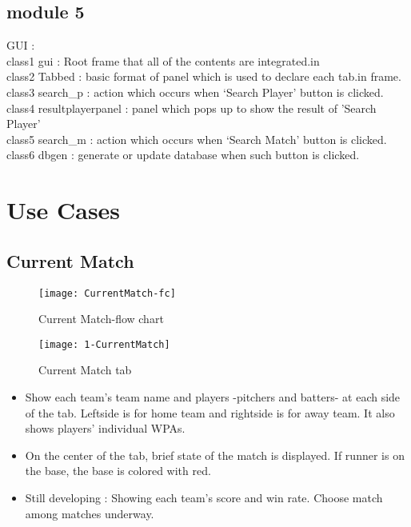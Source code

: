 \documentclass[conference,compsoc, twocolumn]{IEEEtran}
\begin{document}
\subsection{module 5}
GUI : \\
class1 gui : Root frame that all of the contents are integrated.in\\
class2 Tabbed : basic format of panel which is used to declare each tab.in frame.\\
class3 search\_p : action which occurs when ‘Search Player’ button is clicked.\\
class4 resultplayerpanel : panel which pops up to show the result of 'Search Player'\\
class5 search\_m : action which occurs when ‘Search Match’ button is clicked.\\
class6 dbgen : generate or update database when such button is clicked.\\





\section{Use Cases}


\subsection{Current Match}

\begin{figure}[H]
\centering\texttt{[image: CurrentMatch-fc]}
\caption{Current Match-flow chart}
\end{figure}

\begin{figure}[H]
\centering\texttt{[image: 1-CurrentMatch]}
\caption{Current Match tab}
\end{figure}

\begin{itemize}
\item Show each team’s team name and players -pitchers and batters- at each side of the tab. Leftside is for home team and rightside is for away team. It also shows players’ individual WPAs. 
\item On the center of the tab, brief state of the match is displayed. If runner is on the base, the base is colored with red.
\item Still developing : Showing each team’s score and win rate. Choose match among matches underway.
\end{itemize}
\end{document}
